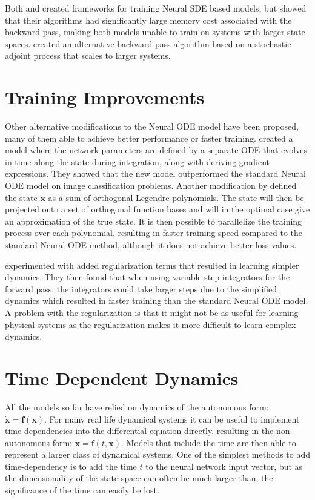 \documentclass[12pt,a4paper]{book}
\begin{document}
Both \cite{neuralsdegaussian} and \cite{neuralsde} created frameworks for training Neural SDE based models, but \cite{sdegradients} showed that their algorithms had significantly large memory cost associated with the backward pass, making both models unable to train on systems with larger state spaces. \cite{sdegradients} created an alternative backward pass algorithm based on a stochastic adjoint process that scales to larger systems.

\section{Training Improvements}

Other alternative modifications to the Neural ODE model have been proposed, many of them able to achieve better performance or faster training. \cite{anodev2} created a model where the network parameters are defined by a separate ODE that evolves in time along the state during integration, along with deriving gradient expressions. They showed that the new model outperformed the standard Neural ODE model on image classification problems. Another modification by \cite{spectralnode} defined the state $\bm{x}$ as a sum of orthogonal Legendre polynomials. The state will then be projected onto a set of orthogonal function bases and will in the optimal case give an approximation of the true state. It is then possible to parallelize the training process over each polynomial, resulting in faster training speed compared to the standard Neural ODE method, although it does not achieve better loss values.

\cite{finlay2020train} experimented with added regularization terms that resulted in learning simpler dynamics. They then found that when using variable step integrators for the forward pass, the integrators could take larger steps due to the simplified dynamics which resulted in faster training than the standard Neural ODE model. A problem with the regularization is that it might not be as useful for learning physical systems as the regularization makes it more difficult to learn complex dynamics.

\section{Time Dependent Dynamics}

All the models so far have relied on dynamics of the autonomous form: $\dot{\bm{x}} = \bm{f}(\bm{x})$. For many real life dynamical systems it can be useful to implement time dependencies into the differential equation directly, resulting in the non-autonomous form: $\dot{\bm{x}} = \bm{f}(t, \bm{x})$. Models that include the time are then able to represent a larger class of dynamical systems. One of the simplest methods to add time-dependency is to add the time $t$ to the neural network input vector, but as the dimensionality of the state space can often be much larger than, the significance of the time can easily be lost.
\end{document}
